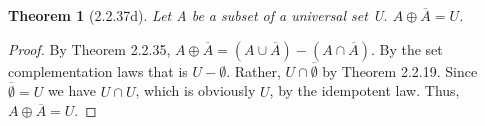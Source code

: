 \documentclass[a4paper, 12pt]{article}
\theoremstyle{plain}
\newtheorem*{theorem*}{Theorem}
\begin{document}
	
	\begin{theorem*}[2.2.37d]
		Let A be a subset of a universal set U. $A \oplus \overline{A} = U$.
	\end{theorem*}
	
	\begin{proof}
		By Theorem 2.2.35, $A \oplus \overline{A} = (A \cup \overline{A}) - (A \cap \overline{A})$. By the set complementation laws that is $U - \emptyset$. Rather, $U \cap \overline{\emptyset}$ by Theorem 2.2.19. Since $\overline{\emptyset} = U$ we have $U \cap U$, which is obviously $U$, by the idempotent law. Thus, $A \oplus \overline{A} = U$.
	\end{proof}
\end{document}
